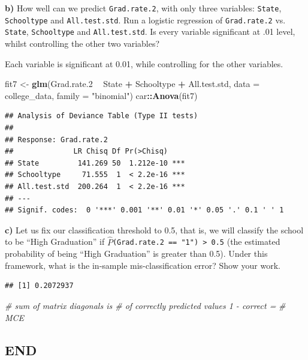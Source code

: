 \documentclass[]{article}
\newenvironment{Shaded}{\begin{snugshade}}{\end{snugshade}}
\newcommand{\KeywordTok}[1]{\textcolor[rgb]{0.13,0.29,0.53}{\textbf{#1}}}
\newcommand{\DataTypeTok}[1]{\textcolor[rgb]{0.13,0.29,0.53}{#1}}
\newcommand{\DecValTok}[1]{\textcolor[rgb]{0.00,0.00,0.81}{#1}}
\newcommand{\FloatTok}[1]{\textcolor[rgb]{0.00,0.00,0.81}{#1}}
\newcommand{\StringTok}[1]{\textcolor[rgb]{0.31,0.60,0.02}{#1}}
\newcommand{\CommentTok}[1]{\textcolor[rgb]{0.56,0.35,0.01}{\textit{#1}}}
\newcommand{\OperatorTok}[1]{\textcolor[rgb]{0.81,0.36,0.00}{\textbf{#1}}}
\newcommand{\NormalTok}[1]{#1}
\begin{document}
\textbf{b)} How well can we predict \texttt{Grad.rate.2}, with only
three variables: \texttt{State}, \texttt{Schooltype} and
\texttt{All.test.std}. Run a logistic regression of \texttt{Grad.rate.2}
vs. \texttt{State}, \texttt{Schooltype} and \texttt{All.test.std}. Is
every variable significant at .01 level, whilst controlling the other
two variables?

Each variable is significant at 0.01, while controlling for the other
variables.

\begin{Shaded}
\begin{Highlighting}[]
\NormalTok{fit7 <-}\StringTok{ }\KeywordTok{glm}\NormalTok{(Grad.rate.}\DecValTok{2} \OperatorTok{~}\StringTok{ }\NormalTok{State }\OperatorTok{+}\StringTok{ }\NormalTok{Schooltype }\OperatorTok{+}\StringTok{ }\NormalTok{All.test.std, }\DataTypeTok{data =}\NormalTok{ college_data, }
    \DataTypeTok{family =} \StringTok{"binomial"}\NormalTok{)}
\NormalTok{car}\OperatorTok{::}\KeywordTok{Anova}\NormalTok{(fit7)}
\end{Highlighting}
\end{Shaded}

\begin{verbatim}
## Analysis of Deviance Table (Type II tests)
## 
## Response: Grad.rate.2
##              LR Chisq Df Pr(>Chisq)    
## State         141.269 50  1.212e-10 ***
## Schooltype     71.555  1  < 2.2e-16 ***
## All.test.std  200.264  1  < 2.2e-16 ***
## ---
## Signif. codes:  0 '***' 0.001 '**' 0.01 '*' 0.05 '.' 0.1 ' ' 1
\end{verbatim}

\textbf{c)} Let us fix our classification threshold to 0.5, that is, we
will classify the school to be ``High Graduation'' if
\(\hat{P}\)\texttt{(Grad.rate.2\ ==\ "1")\ \textgreater{}\ 0.5} (the
estimated probability of being ``High Graduation'' is greater than 0.5).
Under this framework, what is the in-sample mis-classification error?
Show your work.

\begin{Shaded}
\end{Shaded}

\begin{verbatim}
## [1] 0.2072937
\end{verbatim}

\begin{Shaded}
\begin{Highlighting}[]
\CommentTok{# sum of matrix diagonals is # of correctly predicted values 1 - correct =}
\CommentTok{# MCE}
\end{Highlighting}
\end{Shaded}

\vspace{.5in}

\subsection{END}\label{end}
\end{document}
